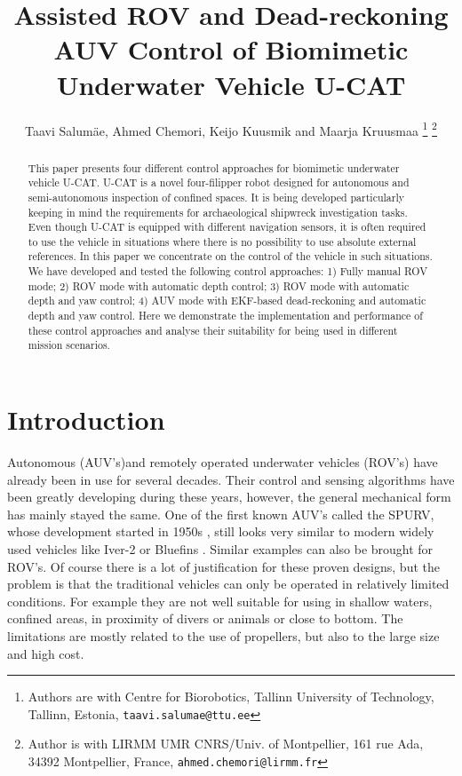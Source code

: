 \documentclass[conference]{IEEEtran}
\begin{document}
\title{Assisted ROV and Dead-reckoning AUV Control of Biomimetic Underwater Vehicle U-CAT}

\author{Taavi Salum\"{a}e, Ahmed Chemori, Keijo Kuusmik and Maarja Kruusmaa%
\thanks{Authors are with Centre for Biorobotics, Tallinn University of Technology, Tallinn, Estonia, {\tt\small taavi.salumae@ttu.ee}}%
\thanks{Author is with LIRMM UMR CNRS/Univ. of Montpellier, 161 rue Ada, 34392 Montpellier, France, {\tt\small ahmed.chemori@lirmm.fr}}}

\maketitle

\begin{abstract}
This paper presents four different control approaches for biomimetic underwater vehicle U-CAT.
U-CAT is a novel four-filipper robot designed for autonomous and semi-autonomous inspection of confined spaces.
It is being developed particularly keeping in mind the requirements for archaeological shipwreck investigation tasks.
Even though U-CAT is equipped with different navigation sensors, it is often required to use the vehicle in situations where there is no possibility to use absolute external references. 
In this paper we concentrate on the control of the vehicle in such situations.
We have developed and tested the following control approaches: 
1) Fully manual ROV mode; 
2) ROV mode with automatic depth control; 
3) ROV mode with automatic depth and yaw control; 
4) AUV mode with EKF-based dead-reckoning and automatic depth and yaw control. 
Here we demonstrate the implementation and performance of these control approaches and analyse their suitability for being used in different mission scenarios.  
\end{abstract}

\IEEEpeerreviewmaketitle

\section{Introduction}

Autonomous (AUV's)and remotely operated underwater vehicles (ROV's) have already been in use for several decades. Their control and sensing algorithms have been greatly developing during these years, however, the general mechanical form has mainly stayed the same. One of the first known AUV's called the SPURV, whose development started in 1950s \cite{nodland1968spurv}, still looks very similar to modern widely used vehicles like Iver-2 \cite{anderson2005workhorse} or Bluefins \cite{bluefin}. Similar examples can also be brought for ROV's. Of course there is a lot of justification for these proven designs, but the problem is that the traditional vehicles can only be operated in relatively limited conditions. For example they are not well suitable for using in shallow waters, confined areas, in proximity of divers or animals or close to bottom. The limitations are mostly related to the use of propellers, but also to the large size and high cost.
\end{document}
